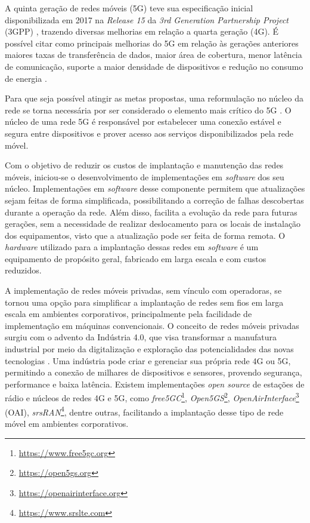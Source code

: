 A quinta geração de redes móveis (5G) teve sua especificação inicial disponibilizada em 2017 na \textit{Release 15} da \textit{3rd Generation Partnership Project} (3GPP) \cite{Redana2020}, trazendo diversas melhorias em relação a quarta geração (4G).
É possível citar como principais melhorias do 5G em relação às gerações anteriores maiores taxas de transferência de dados, maior área de cobertura, menor latência de comunicação, suporte a maior densidade de dispositivos e redução no consumo de energia \cite{Ahmad2019}.

Para que seja possível atingir as metas propostas, uma reformulação no núcleo da rede se torna necessária por ser considerado o elemento mais crítico do 5G \cite{Cardoso2020}.
O núcleo de uma rede 5G é responsável por estabelecer uma conexão estável e segura entre dispositivos e prover acesso aos serviços disponibilizados pela rede móvel.

Com o objetivo de reduzir os custos de implantação e manutenção das redes móveis, iniciou-se o desenvolvimento de implementações em \textit{software} dos seu núcleo.
Implementações em \textit{software} desse componente permitem que atualizações sejam feitas de forma simplificada, possibilitando a correção de falhas descobertas durante a operação da rede. Além disso, facilita a evolução da rede para futuras gerações, sem a necessidade de realizar deslocamento para os locais de instalação dos equipamentos, visto que a atualização pode ser feita de forma remota.
O \textit{hardware} utilizado para a implantação dessas redes em \textit{software} é um equipamento de propósito geral, fabricado em larga escala e com custos reduzidos.

A implementação de redes móveis privadas, sem vínculo com operadoras, se tornou uma opção para simplificar a implantação de redes sem fios em larga escala em ambientes corporativos, principalmente pela facilidade de implementação em máquinas convencionais.
O conceito de redes móveis privadas surgiu com o advento da Indústria 4.0, que visa transformar a manufatura industrial por meio da digitalização e exploração das potencialidades das novas tecnologias \cite{Rojko2017}.
Uma indústria pode criar e gerenciar sua própria rede 4G ou 5G, permitindo a conexão de milhares de dispositivos e sensores, provendo segurança, performance e baixa latência.
Existem implementações \textit{open source} de estações de rádio e núcleos de redes 4G e 5G, como \textit{free5GC}\footnote{\url{https://www.free5gc.org}}, \textit{Open5GS}\footnote{\url{https://open5gs.org}}, \textit{OpenAirInterface}\footnote{\url{https://openairinterface.org}} (OAI), \textit{srsRAN}\footnote{\url{https://www.srslte.com}}, dentre outras, facilitando a implantação desse tipo de rede móvel em ambientes corporativos.

